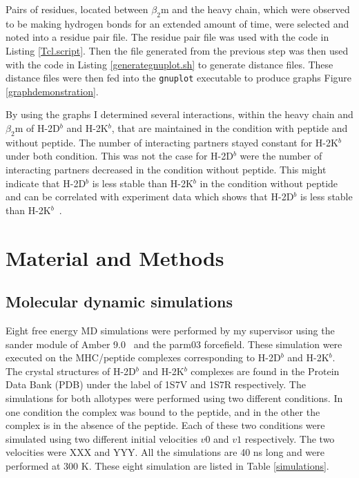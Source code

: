 \documentclass[11pt,twocolumn]{article}
\newcommand{\4}{four {\AA}ngstroms}
\begin{document}
Pairs of residues, located between $\beta_{2}$m and the heavy chain, which were observed to be making hydrogen bonds for an extended amount of time, were selected and noted into a residue pair file. The residue pair file was used with the code in Listing \ref{Tcl.script}.  Then the  file generated from the previous step was then used with the code in Listing \ref{generategnuplot.sh} to generate distance files. These distance files were then fed into the \texttt{gnuplot} executable to produce graphs Figure \ref{graphdemonstration}. 

By using the graphs I determined several interactions, within the heavy chain and $\beta_{2}$m of H-2D$^{b}$ and H-2K$^{b}$, that are maintained in the condition with peptide and  without peptide. The number of interacting partners stayed constant for H-2K$^{b}$ under both condition. This was not the case for H-2D$^{b}$ were the number of interacting partners decreased in the condition without peptide. This might indicate that H-2D$^{b}$ is less stable than H-2K$^{b}$ in the condition without peptide and can be correlated with experiment data which shows that H-2D$^{b}$ is less stable than H-2K$^{b}$~\cite{Shields1999561}.

\section*{Material and Methods}

\subsection*{Molecular dynamic simulations}

Eight free energy MD simulations were  performed by my supervisor using the sander module of Amber 9.0~\cite{case2005amber} and the parm03 forcefield.
These simulation were executed on the  MHC/peptide complexes corresponding to  H-2D$^{b}$ and  H-2K$^{b}$. 
The crystal structures of H-2D$^{b}$ and  H-2K$^{b}$ complexes are found in the Protein Data Bank (PDB) under the label of 1S7V and  1S7R respectively. 
The simulations for both allotypes were performed using two different conditions. 
In one condition the complex was bound to the peptide, and in the other  the complex is in the absence of the peptide. 
Each of these two conditions were simulated using two different initial velocities $v0$ and $v1$ respectively. The two velocities were XXX and YYY. 
All the simulations are 40 ns long and were performed  at 300 K. These eight simulation are listed in Table \ref{simulations}.
\end{document}
